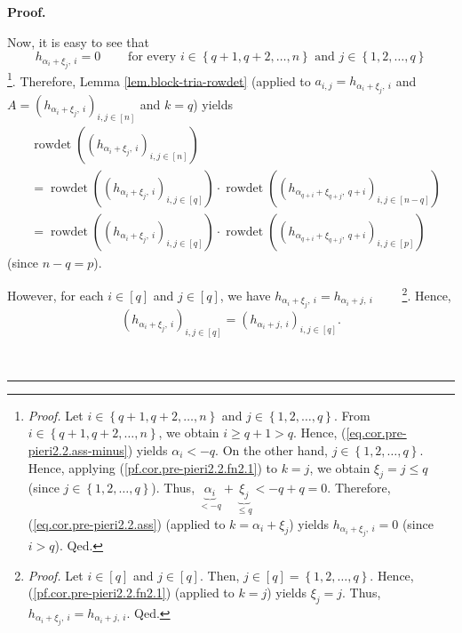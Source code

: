 \documentclass
[numbers=enddot,12pt,final,onecolumn,notitlepage,english]{scrartcl}%
\theoremstyle{definition}
\newenvironment{proof}[1][Proof]{\noindent\textbf{#1.} }{\ \rule{0.5em}{0.5em}}
\newenvironment{verlong}{}{}
\newenvironment{vershort}{}{}
\begin{document}
\begin{proof}
\begin{vershort}
\end{vershort}

\begin{verlong}
Now, it is easy to see that
\[
h_{\alpha_{i}+\xi_{j},\ i}=0\ \ \ \ \ \ \ \ \ \ \text{for every }i\in\left\{
q+1,q+2,\ldots,n\right\}  \text{ and }j\in\left\{  1,2,\ldots,q\right\}
\]
\footnote{\textit{Proof.} Let $i\in\left\{  q+1,q+2,\ldots,n\right\}  $ and
$j\in\left\{  1,2,\ldots,q\right\}  $. From $i\in\left\{  q+1,q+2,\ldots
,n\right\}  $, we obtain $i\geq q+1>q$. Hence,
(\ref{eq.cor.pre-pieri2.2.ass-minus}) yields $\alpha_{i}<-q$. On the other
hand, $j\in\left\{  1,2,\ldots,q\right\}  $. Hence, applying
(\ref{pf.cor.pre-pieri2.2.fn2.1}) to $k=j$, we obtain $\xi_{j}=j\leq q$ (since
$j\in\left\{  1,2,\ldots,q\right\}  $). Thus, $\underbrace{\alpha_{i}}%
_{<-q}+\underbrace{\xi_{j}}_{\leq q}<-q+q=0$. Therefore,
(\ref{eq.cor.pre-pieri2.2.ass}) (applied to $k=\alpha_{i}+\xi_{j}$) yields
$h_{\alpha_{i}+\xi_{j},\ i}=0$ (since $i>q$). Qed.}. Therefore, Lemma
\ref{lem.block-tria-rowdet} (applied to $a_{i,j}=h_{\alpha_{i}+\xi_{j},\ i}$
and $A=\left(  h_{\alpha_{i}+\xi_{j},\ i}\right)  _{i,j\in\left[  n\right]  }$
and $k=q$) yields%
\begin{align}
&  \operatorname*{rowdet}\left(  \left(  h_{\alpha_{i}+\xi_{j},\ i}\right)
_{i,j\in\left[  n\right]  }\right) \nonumber\\
&  =\operatorname*{rowdet}\left(  \left(  h_{\alpha_{i}+\xi_{j},\ i}\right)
_{i,j\in\left[  q\right]  }\right)  \cdot\operatorname*{rowdet}\left(  \left(
h_{\alpha_{q+i}+\xi_{q+j},\ q+i}\right)  _{i,j\in\left[  n-q\right]  }\right)
\nonumber\\
&  =\operatorname*{rowdet}\left(  \left(  h_{\alpha_{i}+\xi_{j},\ i}\right)
_{i,j\in\left[  q\right]  }\right)  \cdot\operatorname*{rowdet}\left(  \left(
h_{\alpha_{q+i}+\xi_{q+j},\ q+i}\right)  _{i,j\in\left[  p\right]  }\right)
\label{pf.cor.pre-pieri2.2.3}%
\end{align}
(since $n-q=p$).

However, for each $i\in\left[  q\right]  $ and $j\in\left[  q\right]  $, we
have $h_{\alpha_{i}+\xi_{j},\ i}=h_{\alpha_{i}+j,\ i}$%
\ \ \ \ \footnote{\textit{Proof.} Let $i\in\left[  q\right]  $ and
$j\in\left[  q\right]  $. Then, $j\in\left[  q\right]  =\left\{
1,2,\ldots,q\right\}  $. Hence, (\ref{pf.cor.pre-pieri2.2.fn2.1}) (applied to
$k=j$) yields $\xi_{j}=j$. Thus, $h_{\alpha_{i}+\xi_{j},\ i}=h_{\alpha
_{i}+j,\ i}$. Qed.}. Hence,
\begin{equation}
\left(  h_{\alpha_{i}+\xi_{j},\ i}\right)  _{i,j\in\left[  q\right]  }=\left(
h_{\alpha_{i}+j,\ i}\right)  _{i,j\in\left[  q\right]  }.
\label{pf.cor.pre-pieri2.2.4}%
\end{equation}



\end{verlong}
\end{proof}
\end{document}

